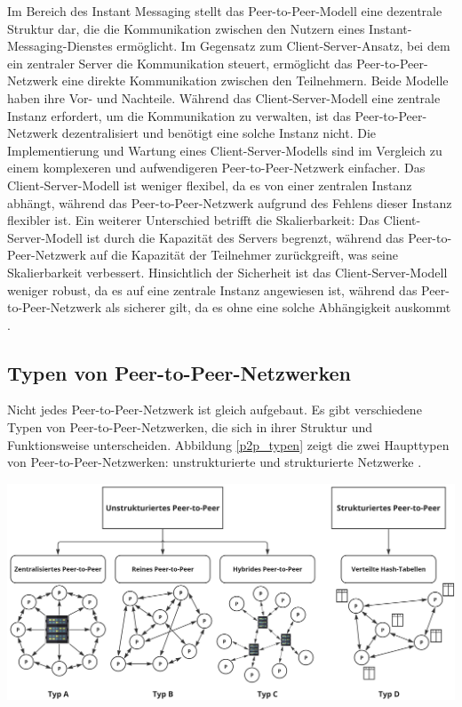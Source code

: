 Im Bereich des Instant Messaging stellt das Peer-to-Peer-Modell eine dezentrale Struktur dar, die die Kommunikation zwischen den Nutzern eines Instant-Messaging-Dienstes ermöglicht. Im Gegensatz zum Client-Server-Ansatz, bei dem ein zentraler Server die Kommunikation steuert, ermöglicht das Peer-to-Peer-Netzwerk eine direkte Kommunikation zwischen den Teilnehmern. Beide Modelle haben ihre Vor- und Nachteile. Während das Client-Server-Modell eine zentrale Instanz erfordert, um die Kommunikation zu verwalten, ist das Peer-to-Peer-Netzwerk dezentralisiert und benötigt eine solche Instanz nicht. Die Implementierung und Wartung eines Client-Server-Modells sind im Vergleich zu einem komplexeren und aufwendigeren Peer-to-Peer-Netzwerk einfacher. Das Client-Server-Modell ist weniger flexibel, da es von einer zentralen Instanz abhängt, während das Peer-to-Peer-Netzwerk aufgrund des Fehlens dieser Instanz flexibler ist. Ein weiterer Unterschied betrifft die Skalierbarkeit: Das Client-Server-Modell ist durch die Kapazität des Servers begrenzt, während das Peer-to-Peer-Netzwerk auf die Kapazität der Teilnehmer zurückgreift, was seine Skalierbarkeit verbessert. Hinsichtlich der Sicherheit ist das Client-Server-Modell weniger robust, da es auf eine zentrale Instanz angewiesen ist, während das Peer-to-Peer-Netzwerk als sicherer gilt, da es ohne eine solche Abhängigkeit auskommt \parencite[S. 6-8]{Mahlmann_P2PNetzwerke}.


\subsection{Typen von Peer-to-Peer-Netzwerken}

Nicht jedes Peer-to-Peer-Netzwerk ist gleich aufgebaut. Es gibt verschiedene Typen von Peer-to-Peer-Netzwerken, die sich in ihrer Struktur und Funktionsweise unterscheiden. Abbildung \ref{p2p_typen} zeigt die zwei Haupttypen von Peer-to-Peer-Netzwerken: unstrukturierte und strukturierte Netzwerke \parencite[S. 362-363]{Luntovskyy_ModRechnernetze}.

\begin{center}
    \captionsetup{type=figure}
    \includegraphics[width=1\linewidth]{images/p2p_typen.png}
    \label{p2p_typen}
\end{center}

